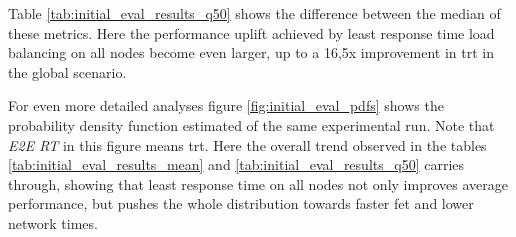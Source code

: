 Table \ref{tab:initial_eval_results_q50} shows the difference between the median of these metrics.
Here the performance uplift achieved by least response time load balancing on all nodes become even larger, up to a 16,5x improvement in \gls{trt} in the global scenario.

For even more detailed analyses figure \ref{fig:initial_eval_pdfs} shows the probability density function estimated of the same experimental run.
Note that \textit{E2E RT} in this figure means \gls{trt}.
Here the overall trend observed in the tables \ref{tab:initial_eval_results_mean} and \ref{tab:initial_eval_results_q50} carries through, showing that least response time on all nodes not only improves average performance, but pushes the whole distribution towards faster \gls{fet} and lower network times.